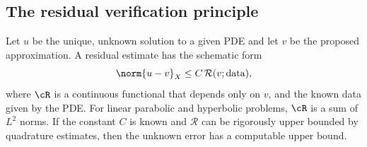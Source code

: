 \subsection{The residual verification principle}\label{subsec:residual-principle}
Let $u$ be the unique, unknown solution to a given PDE and let $v$ be the proposed approximation. A residual estimate has the schematic form
\begin{equation}\label{eq:posteriori-residuals}
    \norm{u-v}_{X} \leq C\,\mathcal R(v;\text{data}),
\end{equation}
where $\cR$ is a continuous functional that depends only on $v$, and the known data given by the PDE. For linear parabolic and hyperbolic problems, $\cR$ is a sum of $L^2$ norms. If the constant $C$ is known and $\mathcal R$ can be rigorously upper bounded by quadrature estimates, then the unknown error has a computable upper bound.

